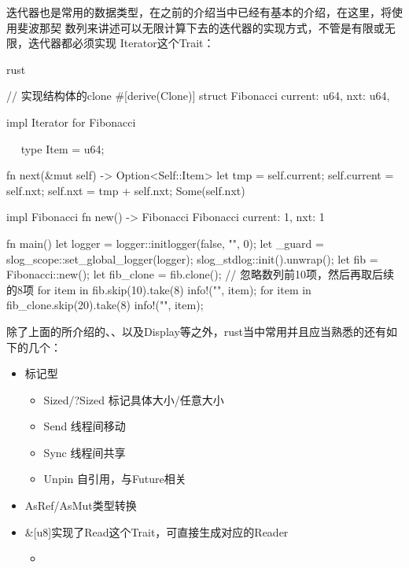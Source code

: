 迭代器也是常用的数据类型，在之前的介绍当中已经有基本的介绍，在这里，将使用斐波那契
数列来讲述可以无限计算下去的迭代器的实现方式，不管是有限或无限，迭代器都必须实现
Iterator这个Trait：
\begin{code-block}[escapeinside=~~, mathescape]{rust}

// 实现结构体的clone
#[derive(Clone)]
struct Fibonacci {
    current: u64,
    nxt: u64,
}

impl Iterator for Fibonacci { ~~
    type Item = u64;

    fn next(&mut self) -> Option<Self::Item> {
        let tmp = self.current;
        self.current = self.nxt;
        self.nxt = tmp + self.nxt;
        Some(self.nxt)
    }
}

impl Fibonacci {
    fn new() -> Fibonacci {
        Fibonacci { current: 1, nxt: 1 }
    }
}

fn main() {
    let logger = logger::initlogger(false, "", 0);
    let _guard = slog_scope::set_global_logger(logger);
    slog_stdlog::init().unwrap();
    let fib = Fibonacci::new();
    let fib_clone = fib.clone();
    // 忽略数列前10项，然后再取后续的8项
    for item in fib.skip(10).take(8) {
        info!("{}", item);
    }
    for item in fib_clone.skip(20).take(8) {
        info!("{}", item);
    }
}
\end{code-block}

除了上面的所介绍的、、以及Display等之外，rust当中常用并且应当熟悉的还有如下的几个：
\begin{itemize}
  \renewcommand\labelitemi{\leftpointright}
  \item 标记型
    \begin{itemize}
      \renewcommand\labelitemii{\ding{79}}
      \item Sized/?Sized 标记具体大小/任意大小
      \item Send 线程间移动
      \item Sync 线程间共享
      \item Unpin 自引用，与Future相关
    \end{itemize}
  \item AsRef/AsMut类型转换
  \item \&[u8]实现了Read这个Trait，可直接生成对应的Reader
    \begin{itemize}
      \renewcommand\labelitemii{\ding{79}}
      \item {}
    \end{itemize}
\end{itemize}

